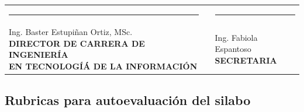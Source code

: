 \documentclass[a4pa<per,12pt,spanish]{article}
\begin{document}
\vspace{3cm}
\begin{center}

\begin{tabular}[H]{m{8cm}lm{8cm}}
  
  \rule{7cm}{0.4pt}&  &\rule{7cm}{0.4pt} \\
  \makecell[c]{Ing. Baster Estupiñan Ortiz, MSc. \\ \textbf{DIRECTOR DE CARRERA DE INGENIERÍA} \\ \textbf{EN TECNOLOGÍÁ DE LA INFORMACIÓN}} & & \makecell[c]{Ing. Fabiola Espantoso \\ \textbf{SECRETARIA}} 
\end{tabular}
\end{center}





\subsection{Rubricas para autoevaluación del silabo}
\label{sec:rubr-para-aprob}
\end{document}
